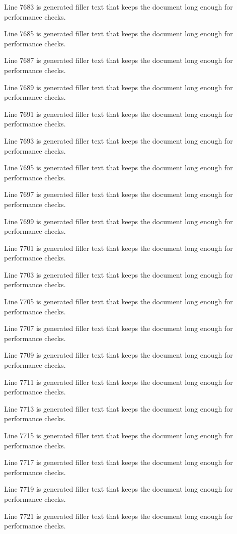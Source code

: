 Line 7683 is generated filler text that keeps the document long enough for performance checks.

Line 7685 is generated filler text that keeps the document long enough for performance checks.

Line 7687 is generated filler text that keeps the document long enough for performance checks.

Line 7689 is generated filler text that keeps the document long enough for performance checks.

Line 7691 is generated filler text that keeps the document long enough for performance checks.

Line 7693 is generated filler text that keeps the document long enough for performance checks.

Line 7695 is generated filler text that keeps the document long enough for performance checks.

Line 7697 is generated filler text that keeps the document long enough for performance checks.

Line 7699 is generated filler text that keeps the document long enough for performance checks.

Line 7701 is generated filler text that keeps the document long enough for performance checks.

Line 7703 is generated filler text that keeps the document long enough for performance checks.

Line 7705 is generated filler text that keeps the document long enough for performance checks.

Line 7707 is generated filler text that keeps the document long enough for performance checks.

Line 7709 is generated filler text that keeps the document long enough for performance checks.

Line 7711 is generated filler text that keeps the document long enough for performance checks.

Line 7713 is generated filler text that keeps the document long enough for performance checks.

Line 7715 is generated filler text that keeps the document long enough for performance checks.

Line 7717 is generated filler text that keeps the document long enough for performance checks.

Line 7719 is generated filler text that keeps the document long enough for performance checks.

Line 7721 is generated filler text that keeps the document long enough for performance checks.

